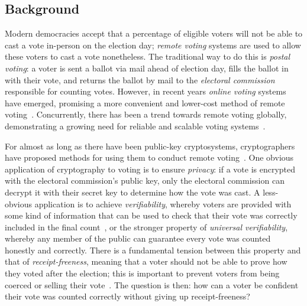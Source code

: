 \documentclass[12pt,a4paper]{article}
\theoremstyle{definition}
\begin{document}
\subsection{Background}
Modern democracies accept that a percentage of eligible voters will not be able to cast a vote in-person on the election day; \textit{remote voting} systems are used to allow these voters to cast a vote nonetheless. The traditional way to do this is \textit{postal voting}: a voter is sent a ballot via mail ahead of election day, fills the ballot in with their vote, and returns the ballot by mail to the \textit{electoral commission} responsible for counting votes. However, in recent years \textit{online voting} systems have emerged, promising a more convenient and lower-cost method of remote voting~\cite{nswivote,scytlsvote}. Concurrently, there has been a trend towards remote voting globally, demonstrating a growing need for reliable and scalable voting systems~\cite{VEC_PostalVoting_Position,rallings2010,gjosteen2011norwegian}.

For almost as long as there have been public-key cryptosystems, cryptographers have proposed methods for using them to conduct remote voting~\cite{cohen1985robust}. One obvious application of cryptography to voting is to ensure \textit{privacy}: if a vote is encrypted with the electoral commission's public key, only the electoral commission can decrypt it with their secret key to determine how the vote was cast. A less-obvious application is to achieve \textit{verifiability}, whereby voters are provided with some kind of information that can be used to check that their vote was correctly included in the final count~\cite{benaloh1987verifiable}, or the stronger property of \textit{universal verifiability}, whereby any member of the public can guarantee every vote was counted honestly and correctly. There is a fundamental tension between this property and that of \textit{receipt-freeness}, meaning that a voter should not be able to prove how they voted after the election; this is important to prevent voters from being coerced or selling their vote~\cite{benaloh1994receipt}. The question is then: how can a voter be confident their vote was counted correctly without giving up receipt-freeness?
\end{document}
